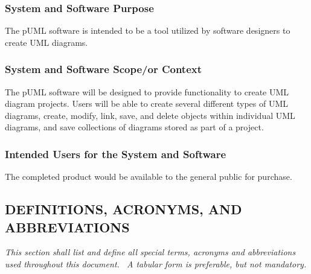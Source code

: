 \documentclass[twoside,letterpaper]{article}
\begin{document}
{\subsubsection{System and Software Purpose}
{\color{black}
The pUML software is intended to be a tool utilized by software designers to create UML diagrams.
}

\subsubsection[System and Software Scope/or Context]{System and Software
Scope/or Context}
{\color{black}
The pUML software will be designed to provide functionality to create UML diagram projects.  Users will be able to create several different types of UML diagrams, create, modify, link, save, and delete objects within individual UML diagrams, and save collections of diagrams stored as part of a project.
}

\subsubsection{Intended Users for the System and Software}
{\color{black}
The completed product would be available to the general public for purchase.
}

\subsection[DEFINITIONS, ACRONYMS, AND
ABBREVIATIONS]{\bfseries\color{black}
DEFINITIONS, ACRONYMS, AND ABBREVIATIONS}
{\itshape\color{black}
This section shall list and define all special terms, acronyms and
abbreviations used throughout this document. \ A tabular form is
preferable, but not mandatory.}


\bigskip

}
\end{document}
